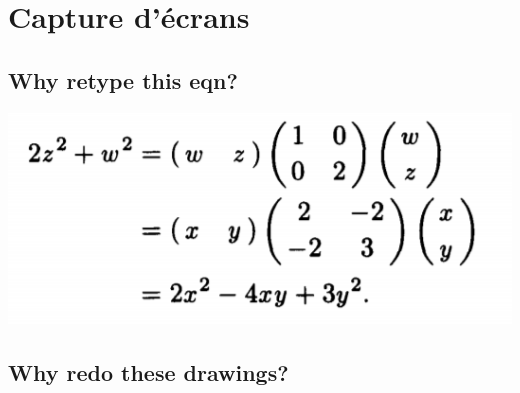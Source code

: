 \documentclass[14pt,fleqn]{article}
\begin{document}
\newpage


\section{Capture d'écrans}

\subsection{Why retype this eqn?}

\includegraphics[scale=.5]{eqn1.png} 


\subsection{Why redo these drawings?}
\end{document}
